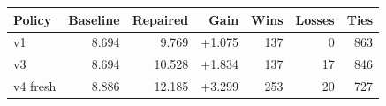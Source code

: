 \begin{center}\small
\begin{tabular}{lrrrrrr}
\toprule
Policy & Baseline & Repaired & Gain & Wins & Losses & Ties \\
\midrule
v1 & 8.694 & 9.769 & +1.075 & 137 & 0 & 863 \\
v3 & 8.694 & 10.528 & +1.834 & 137 & 17 & 846 \\
v4 fresh & 8.886 & 12.185 & +3.299 & 253 & 20 & 727 \\
\bottomrule
\end{tabular}\end{center}
\newcommand{\VoneCI}{$[0.851,\,1.313]$}
